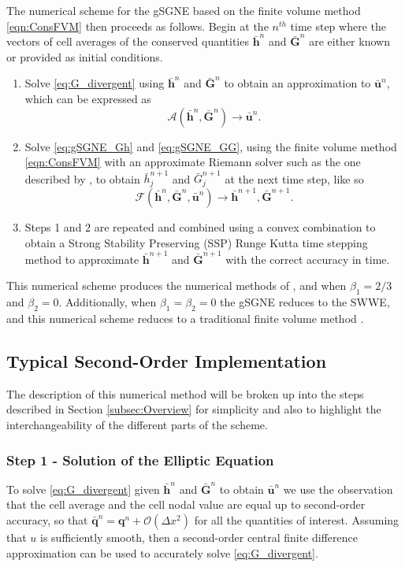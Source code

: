 \documentclass[10pt]{elsarticle}
\newcommand{\vecn}[1]{\boldsymbol{#1}}
\begin{document}
The numerical scheme for the gSGNE based on the finite volume method \eqref{eqn:ConsFVM} then proceeds as follows. Begin at the $n^{th}$ time step where the vectors of cell averages of the conserved quantities $\bar{\vecn{h}}^n$ and $\bar{\vecn{G}}^n$ are either known or provided as initial conditions. 
\begin{enumerate}
	\item Solve \eqref{eq:G_divergent} using $\bar{\vecn{h}}^n$ and $\bar{\vecn{G}}^n$ to obtain an approximation to $\bar{{\vecn{u}}}^n$, which can be expressed as
	\[\mathcal{A}\left(\bar{\vecn{h}}^n,\bar{\vecn{G}}^n\right) \boldsymbol{\rightarrow} \bar{{\vecn{u}}}^n.\]
	\item Solve \eqref{eq:gSGNE_Gh} and \eqref{eq:gSGNE_GG}, using the finite volume method \eqref{eqn:ConsFVM} with an approximate Riemann solver such as the one described by \citet{Kurganov-etal-2001-707}, to obtain $\bar{h}^{n+1}_j$ and $\bar{G}^{n+1}_j$ at the next time step, like so
	\[\mathcal{F}\left(\bar{\vecn{h}}^n,\bar{\vecn{G}}^n,\bar{{\vecn{u}}}^n\right) \boldsymbol{\rightarrow}\bar{\vecn{h}}^{n+1 },\bar{\vecn{G}}^{n+1}.\]
	\item Steps 1 and 2 are repeated and combined using a convex combination to obtain a Strong Stability Preserving (SSP) Runge Kutta time stepping method \cite{Gottlieb-etal-2003-89} to approximate $\bar{\vecn{h}}^{n+1 }$ and $\bar{\vecn{G}}^{n+1}$ with the correct accuracy in time. 
\end{enumerate}

This numerical scheme produces the numerical methods of \citet{Hank-etal-2010-2034}, \citet{Zoppou-etal-2017} and \citet{Pitt-2019} when $\beta_1 = 2/3$ and $\beta_2 = 0$. Additionally, when $\beta_1 = \beta_2 = 0$ the gSGNE reduces to the SWWE, and this numerical scheme reduces to a traditional finite volume method \cite{Roberts-2003-129}.  

\subsection{Typical Second-Order Implementation}
The description of this numerical method will be broken up into the steps described in Section \ref{subsec:Overview} for simplicity and also to highlight the interchangeability of the different parts of the scheme.

\subsubsection{Step 1 - Solution of the Elliptic Equation}
To solve \eqref{eq:G_divergent} given $\bar{\vecn{h}}^n$ and $\bar{\vecn{G}}^n$ to obtain $\bar{\vecn{u}}^n$ we use the observation that the cell average and the cell nodal value are equal up to second-order accuracy, so that $\bar{\vecn{q}}^n = {\vecn{q}}^n + \mathcal{O}\left(\Delta x^2\right)$ for all the quantities of interest. Assuming that $u$ is sufficiently smooth, then a second-order central finite difference approximation can be used to accurately solve \eqref{eq:G_divergent}. 
\end{document}
